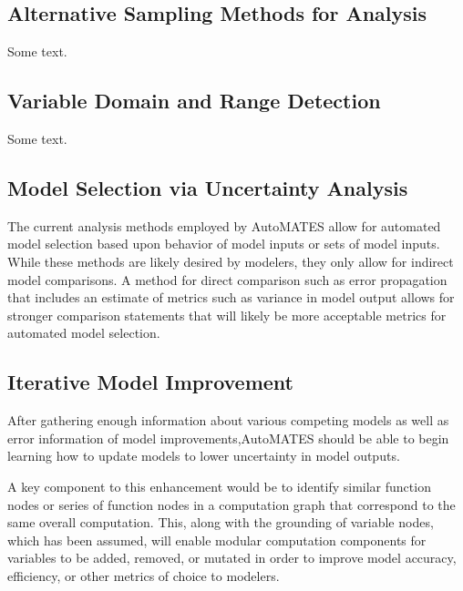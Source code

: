 \subsection{Alternative Sampling Methods for Analysis\label{sec:alt_sampling}}
Some text.

\subsection{Variable Domain and Range Detection\label{sec:var_domain_range}}
Some text.

\subsection{Model Selection via Uncertainty Analysis \label{auto_uncert_analysis}}
The current analysis methods employed by AutoMATES allow for automated model selection based upon behavior of model inputs or sets of model inputs. While these methods are likely desired by modelers, they only allow for indirect model comparisons. A method for direct comparison such as error propagation that includes an estimate of metrics such as variance in model output allows for stronger comparison statements that will likely be more acceptable metrics for automated model selection.

\subsection{Iterative Model Improvement\label{sec:auto_improve}}
After gathering enough information about various competing models as well as error information of model improvements,AutoMATES should be able to begin learning how to update models to lower uncertainty in model outputs.

A key component to this enhancement would be to identify similar function nodes or series of function nodes in a computation graph that correspond to the same overall computation. This, along with the grounding of variable nodes, which has been assumed, will enable modular computation components for variables to be added, removed, or mutated in order to improve model accuracy, efficiency, or other metrics of choice to modelers.

